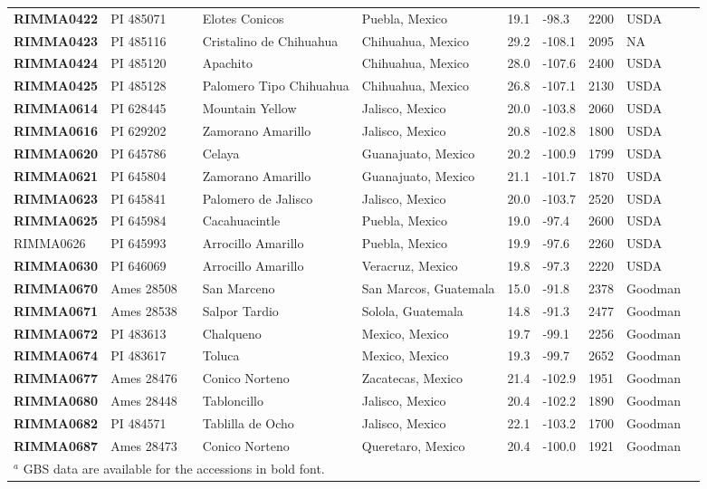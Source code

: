 \documentclass[onecolumn,oneside,letterpaper]{article}
\begin{document}
\begin{table}[h]
\begin{center}
{\begin{tabular}{llllllllll}
{\bf RIMMA0422}	&	PI 485071	&		&	Elotes Conicos	&	Puebla, Mexico	&	19.1 	&	-98.3 	&	2200	&	USDA	\\
{\bf RIMMA0423}	&	PI 485116	&		&	Cristalino de Chihuahua	&	Chihuahua, Mexico	&	29.2 	&	-108.1 	&	2095	&	NA	\\
{\bf RIMMA0424}	&	PI 485120	&		&	Apachito	&	Chihuahua, Mexico	&	28.0 	&	-107.6 	&	2400	&	USDA	\\
{\bf RIMMA0425}	&	PI 485128	&		&	Palomero Tipo Chihuahua	&	Chihuahua, Mexico	&	26.8 	&	-107.1 	&	2130	&	USDA	\\
{\bf RIMMA0614}	&	PI 628445	&		&	Mountain Yellow	&	Jalisco, Mexico	&	20.0 	&	-103.8 	&	2060	&	USDA	\\
{\bf RIMMA0616}	&	PI 629202	&		&	Zamorano Amarillo	&	Jalisco, Mexico	&	20.8 	&	-102.8 	&	1800	&	USDA	\\
{\bf RIMMA0620}	&	PI 645786	&		&	Celaya	&	Guanajuato, Mexico	&	20.2 	&	-100.9 	&	1799	&	USDA	\\
{\bf RIMMA0621}	&	PI 645804	&		&	Zamorano Amarillo	&	Guanajuato, Mexico	&	21.1 	&	-101.7 	&	1870	&	USDA	\\
{\bf RIMMA0623}	&	PI 645841	&		&	Palomero de Jalisco	&	Jalisco, Mexico	&	20.0 	&	-103.7 	&	2520	&	USDA	\\
{\bf RIMMA0625}	&	PI 645984	&		&	Cacahuacintle	&	Puebla, Mexico	&	19.0 	&	-97.4 	&	2600	&	USDA	\\
RIMMA0626	&	PI 645993	&		&	Arrocillo Amarillo	&	Puebla, Mexico	&	19.9 	&	-97.6 	&	2260	&	USDA	\\
{\bf RIMMA0630}	&	PI 646069	&		&	Arrocillo Amarillo	&	Veracruz, Mexico	&	19.8 	&	-97.3 	&	2220	&	USDA	\\
{\bf RIMMA0670}	&	Ames 28508	&		&	San Marceno	&	San Marcos, Guatemala	&	15.0 	&	-91.8 	&	2378	&	Goodman	\\
{\bf RIMMA0671}	&	Ames 28538	&		&	Salpor Tardio	&	Solola, Guatemala	&	14.8 	&	-91.3 	&	2477	&	Goodman	\\
{\bf RIMMA0672}	&	PI 483613	&		&	Chalqueno	&	Mexico, Mexico	&	19.7 	&	-99.1 	&	2256	&	Goodman	\\
{\bf RIMMA0674}	&	PI 483617	&		&	Toluca	&	Mexico, Mexico	&	19.3 	&	-99.7 	&	2652	&	Goodman	\\
{\bf RIMMA0677}	&	Ames 28476 	&		&	Conico Norteno	&	Zacatecas, Mexico	&	21.4 	&	-102.9 	&	1951	&	Goodman	\\
{\bf RIMMA0680}	&	Ames 28448	&		&	Tabloncillo	&	Jalisco, Mexico	&	20.4 	&	-102.2 	&	1890	&	Goodman	\\
{\bf RIMMA0682}	&	PI 484571	&		&	Tablilla de Ocho	&	Jalisco, Mexico	&	22.1 	&	-103.2 	&	1700	&	Goodman	\\
{\bf RIMMA0687}	&	Ames 28473	&		&	Conico Norteno	&	Queretaro, Mexico	&	20.4 	&	-100.0 	&	1921	&	Goodman	\\[-0.1mm]	
	\hline\hline
\multicolumn{9}{l}{$^a$ GBS data are available for the accessions in bold font.}\\
    \end{tabular}}
    \label{srkid}


\end{center}
\end{table}
\end{document}
